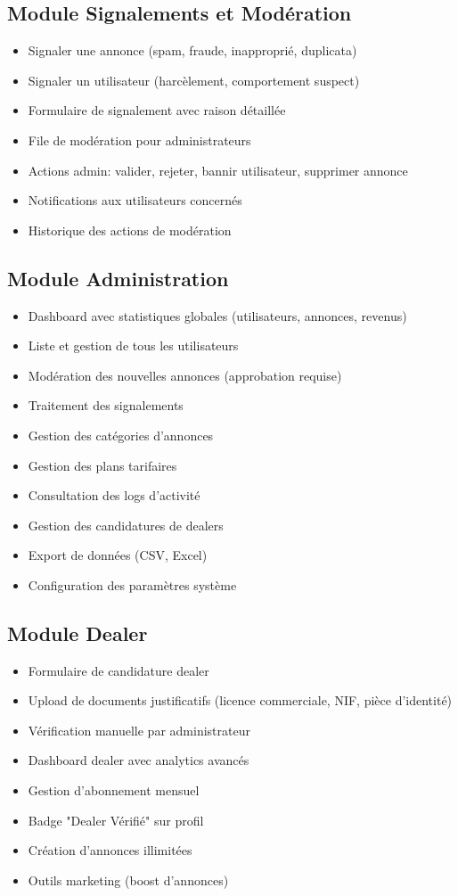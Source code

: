 \documentclass[12pt,a4paper]{report}
\begin{document}
\subsection{Module Signalements et Modération}
\begin{itemize}
    \item Signaler une annonce (spam, fraude, inapproprié, duplicata)
    \item Signaler un utilisateur (harcèlement, comportement suspect)
    \item Formulaire de signalement avec raison détaillée
    \item File de modération pour administrateurs
    \item Actions admin: valider, rejeter, bannir utilisateur, supprimer annonce
    \item Notifications aux utilisateurs concernés
    \item Historique des actions de modération
\end{itemize}

\subsection{Module Administration}
\begin{itemize}
    \item Dashboard avec statistiques globales (utilisateurs, annonces, revenus)
    \item Liste et gestion de tous les utilisateurs
    \item Modération des nouvelles annonces (approbation requise)
    \item Traitement des signalements
    \item Gestion des catégories d'annonces
    \item Gestion des plans tarifaires
    \item Consultation des logs d'activité
    \item Gestion des candidatures de dealers
    \item Export de données (CSV, Excel)
    \item Configuration des paramètres système
\end{itemize}

\subsection{Module Dealer}
\begin{itemize}
    \item Formulaire de candidature dealer
    \item Upload de documents justificatifs (licence commerciale, NIF, pièce d'identité)
    \item Vérification manuelle par administrateur
    \item Dashboard dealer avec analytics avancés
    \item Gestion d'abonnement mensuel
    \item Badge "Dealer Vérifié" sur profil
    \item Création d'annonces illimitées
    \item Outils marketing (boost d'annonces)
\end{itemize}
\end{document}
